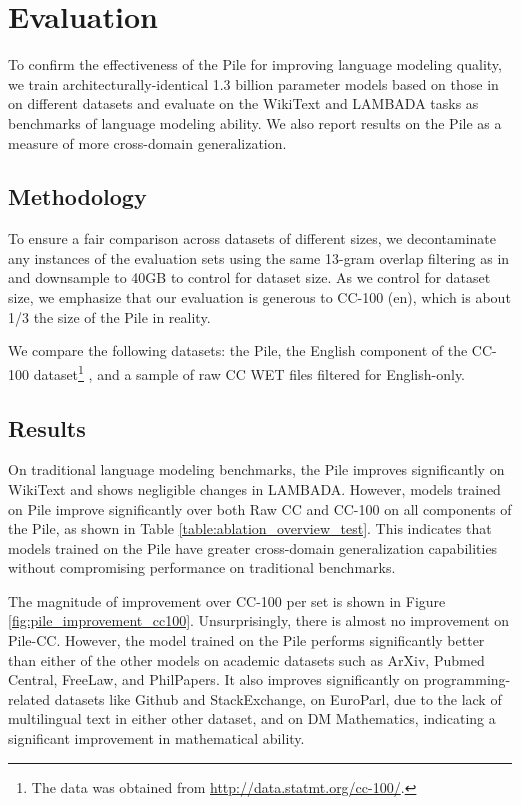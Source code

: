 \section{Evaluation}\label{sec:ablation}

To confirm the effectiveness of the Pile for improving language modeling quality, we train architecturally-identical 1.3 billion parameter models based on those in \citet{GPT3} on different datasets and evaluate on the WikiText and LAMBADA tasks as benchmarks of language modeling ability. We also report results on the Pile as a measure of more cross-domain generalization.

\subsection{Methodology}

To ensure a fair comparison across datasets of different sizes, we decontaminate any instances of the evaluation sets using the same 13-gram overlap filtering as in \citet{GPT3} and downsample to 40GB to control for dataset size. As we control for dataset size, we emphasize that our evaluation is generous to CC-100 (en), which is about 1/3 the size of the Pile in reality.  

We compare the following datasets: the Pile, the English component of the CC-100 dataset\footnote{The data was obtained from \url{http://data.statmt.org/cc-100/}.} \citep{wenzek2019ccnet,conneau2019xlmr}, and a sample of raw CC WET files filtered for English-only. 

\subsection{Results}

On traditional language modeling benchmarks, the Pile improves significantly on WikiText and shows negligible changes in LAMBADA. However, models trained on Pile improve significantly over both Raw CC and CC-100 on all components of the Pile, as shown in Table \ref{table:ablation_overview_test}. This indicates that models trained on the Pile have greater cross-domain generalization capabilities without compromising performance on traditional benchmarks.

The magnitude of improvement over CC-100 per set is shown in Figure \ref{fig:pile_improvement_cc100}. Unsurprisingly, there is almost no improvement on Pile-CC. However, the model trained on the Pile performs significantly better than either of the other models on academic datasets such as ArXiv, Pubmed Central, FreeLaw, and PhilPapers. It also improves significantly on programming-related datasets like Github and StackExchange, on EuroParl, due to the lack of multilingual text in either other dataset, and on DM Mathematics, indicating a significant improvement in mathematical ability.

